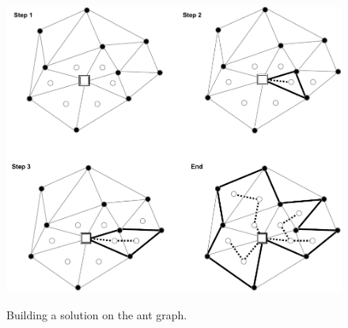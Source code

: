 \begin{figure}[h]
	\begin{centering}
		{\includegraphics[width=\textwidth]{figures/background/aco_grid.pdf}}
		\caption[Ant Graph]{Building a solution on the ant graph.}
		\label{fig:aco_grid}
	\end{centering}
\end{figure}
